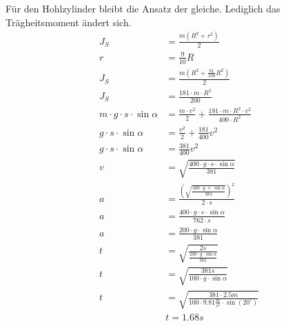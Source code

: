 \documentclass{article}
\begin{document}
	Für den Hohlzylinder bleibt die Ansatz der gleiche. Lediglich das Trägheitsmoment ändert sich.
	\begin{align*}
		J_S&=\frac{m(R^2+r^2)}{2}\\
		r&=\frac{9}{10}R\\
		J_S&=\frac{m(R^2+\frac{81}{100}R^2)}{2}\\
		J_S&=\frac{181\cdot m\cdot R^2}{200}\\
		m\cdot g\cdot s\cdot\sin\alpha&=\frac{m\cdot v^2}{2}+\frac{181\cdot m\cdot R^2\cdot v^2}{400\cdot R^2}\\
		g\cdot s\cdot\sin\alpha&=\frac{v^2}{2}+\frac{181}{400}v^2\\
		g\cdot s\cdot\sin\alpha&=\frac{381}{400}v^2\\
		v&=\sqrt{\frac{400\cdot g\cdot s\cdot\sin\alpha}{381}}\\
		a&=\frac{\left(\sqrt{\frac{400\cdot g\cdot s\cdot\sin\alpha}{381}}\right)^2}{2\cdot s}\\
		a&=\frac{400\cdot g\cdot s\cdot\sin\alpha}{762\cdot s}\\
		a&=\frac{200\cdot g\cdot\sin\alpha}{381}\\
		t&=\sqrt{\frac{2s}{\frac{200\cdot g\cdot\sin\alpha}{381}}}\\
		t&=\sqrt{\frac{381s}{100\cdot g\cdot\sin\alpha}}\\
		t&=\sqrt{\frac{381\cdot2.5m}{100\cdot9.81\frac{m}{s^2}\cdot\sin(20^\circ)}}\\
		&\boxed{t=1.68s}	\tag{c}	\label{eq:214_c}
	\end{align*}
	\newpage
	
\end{document}
